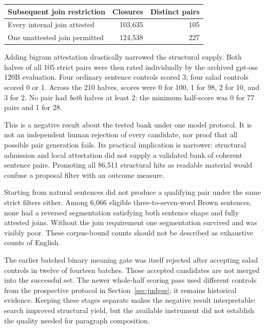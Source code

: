 \documentclass[11pt,letterpaper]{article}
\newcommand{\pageend}{\clearpage}
\begin{document}
\begin{center}\small
\begin{tabular}{lrr}\toprule
Subsequent join restriction & Closures & Distinct pairs\\\midrule
Every internal join attested & 103,635 & 105\\
One unattested join permitted & 124,538 & 227\\\bottomrule
\end{tabular}
\end{center}

Adding bigram attestation drastically narrowed the structural supply. Both halves of all 105 strict pairs were then rated individually by the archived gpt-oss 120B evaluation. Four ordinary sentence controls scored 3; four salad controls scored 0 or 1. Across the 210 halves, scores were 0 for 100, 1 for 98, 2 for 10, and 3 for 2. No pair had \emph{both} halves at least 2: the minimum half-score was 0 for 77 pairs and 1 for 28.

This is a negative result about the tested bank under one model protocol. It is not an independent human rejection of every candidate, nor proof that all possible pair generation fails. Its practical implication is narrower: structural admission and local attestation did not supply a validated bank of coherent sentence pairs. Promoting all 86,511 structural hits as readable material would confuse a proposal filter with an outcome measure.

Starting from natural sentences did not produce a qualifying pair under the same strict filters either. Among 6,066 eligible three-to-seven-word Brown sentences, none had a reversed segmentation satisfying both sentence shape and fully attested joins. Without the join requirement one segmentation survived and was visibly poor. These corpus-bound counts should not be described as exhaustive counts of English.

The earlier batched binary meaning gate was itself rejected after accepting salad controls in twelve of fourteen batches. Those accepted candidates are not merged into the successful set. The newer whole-half scoring pass used different controls from the prospective protocol in Section~\ref{sec:judges}; it remains historical evidence. Keeping these stages separate makes the negative result interpretable: search improved structural yield, but the available instrument did not establish the quality needed for paragraph composition.
\pageend
\end{document}
